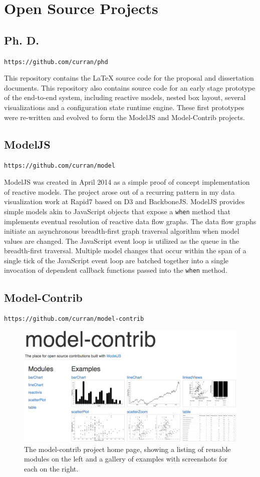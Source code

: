 \documentclass{umthesis}          %
\newcommand{\figureWidth}{6in}
\begin{document}
\chapter{Open Source Projects}

\section{Ph. D.}
\verb`https://github.com/curran/phd`

This repository contains the LaTeX source code for the proposal and dissertation documents. This repository also contains source code for an early stage prototype of the end-to-end system, including reactive models, nested box layout, several visualizations and a configuration state runtime engine. These first prototypes were re-written and evolved to form the ModelJS and Model-Contrib projects.

\section{ModelJS}
\verb`https://github.com/curran/model`

ModelJS was created in April 2014 as a simple proof of concept implementation of reactive models. The project arose out of a recurring pattern in my data visualization work at Rapid7 based on D3 and BackboneJS. ModelJS provides simple models akin to JavaScript objects that expose a \verb`when` method that implements eventual resolution of reactive data flow graphs. The data flow graphs initiate an asynchronous breadth-first graph traversal algorithm when model values are changed. The JavaScript event loop is utilized as the queue in the breadth-first traversal. Multiple model changes that occur within the span of a single tick of the JavaScript event loop are batched together into a single invocation of dependent callback functions passed into the \verb`when` method.
\section{Model-Contrib}
\verb`https://github.com/curran/model-contrib`

\begin{figure}
  \centering
  \includegraphics[width=\figureWidth]{figs/model-contrib.png}
  \caption [Model-Contrib Home Page]{The model-contrib project home page, showing a listing of reusable modules on the left and a gallery of examples with screenshots for each on the right.}
  \label{fig:lds}
\end{figure}
\end{document}
